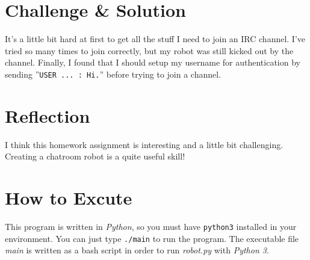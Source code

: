 \documentclass[14pt,a4paper]{extarticle}
\begin{document}
\section*{Challenge \& Solution}

It's a little bit hard at first to get all the stuff I need to join an IRC channel. I've tried so many times to join correctly, but my robot was still kicked out by the channel. Finally, I found that I should setup my username for authentication by sending ''\texttt{USER ... : Hi.}'' before trying to join a channel.

\section*{Reflection}

I think this homework assignment is interesting and a little bit challenging. Creating a chatroom robot is a quite useful skill!

\section*{How to Excute}

This program is written in \textit{Python}, so you must have \texttt{python3} installed in your environment. You can just type \texttt{./main} to run the program. The executable file \textit{main} is written as a bash script in order to run \textit{robot.py} with \textit{Python 3}.
\end{document}
